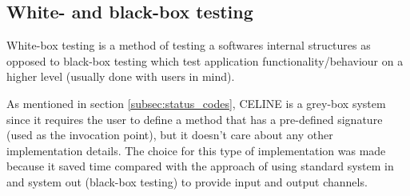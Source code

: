 \subsection{White- and black-box testing} \label{subsec:whitebox_blackbox}
White-box testing is a method of testing a softwares internal structures as opposed to black-box testing which test application functionality/behaviour on a higher level (usually done with users in mind).

As mentioned in section \ref{subsec:status_codes}, CELINE is a grey-box system since it requires the user to define a method that has a pre-defined signature (used as the invocation point), but it doesn't care about any other implementation details. The choice for this type of implementation was made because it saved time compared with the approach of using standard system in and system out (black-box testing) to provide input and output channels. 

